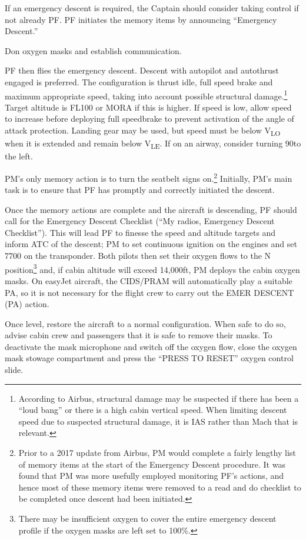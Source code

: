\documentclass[a5paper,11pt,twoside]{book}
\newcommand{\V}[1]{V\textsubscript{#1}}
\begin{document}
If an emergency descent is required, the Captain should consider taking control
if not already PF. PF initiates the memory items by announcing ``Emergency
Descent.''

Don oxygen masks and establish communication.

PF then flies the emergency descent.  Descent with autopilot and autothrust
engaged is preferred. The configuration is thrust idle, full speed brake and
maximum appropriate speed, taking into account possible structural
damage.\footnote{According to Airbus, structural damage may be suspected if
there has been a ``loud bang'' or there is a high cabin vertical speed. When
limiting descent speed due to suspected structural damage, it is IAS rather than
Mach that is relevant.} Target altitude is FL100 or MORA if this is higher. If
speed is low, allow speed to increase before deploying full speedbrake to
prevent activation of the angle of attack protection. Landing gear may be used,
but speed must be below \V{LO} when it is extended and remain below \V{LE}. If
on an airway, consider turning 90\textdegree{ }to the left.

PM's only memory action is to turn the seatbelt signs on.\footnote{Prior to a
2017 update from Airbus, PM would complete a fairly lengthy list of memory items
at the start of the Emergency Descent procedure. It was found that PM was more
usefully employed monitoring PF's actions, and hence most of these memory items
were removed to a read and do checklist to be completed once descent had been
initiated.} Initially, PM's main task is to ensure that PF has promptly and
correctly initiated the descent.

Once the memory actions are complete and the aircraft is descending, PF should
call for the Emergency Descent Checklist (``My radios, Emergency Descent
Checklist''). This will lead PF to finesse the speed and altitude targets and
inform ATC of the descent; PM to set continuous ignition on the engines and set
7700 on the transponder. Both pilots then set their oxygen flows to the N
position\footnote{There may be insufficient oxygen to cover the entire emergency
descent profile if the oxygen masks are left set to 100\%.} and, if cabin
altitude will exceed 14,000ft, PM deploys the cabin oxygen masks. On easyJet
aircraft, the CIDS/PRAM will automatically play a suitable PA, so it is not
necessary for the flight crew to carry out the EMER DESCENT (PA) action.

Once level, restore the aircraft to a normal configuration. When safe to do so,
advise cabin crew and passengers that it is safe to remove their masks. To
deactivate the mask microphone and switch off the oxygen flow, close the oxygen
mask stowage compartment and press the ``PRESS TO RESET'' oxygen control slide.
\end{document}

